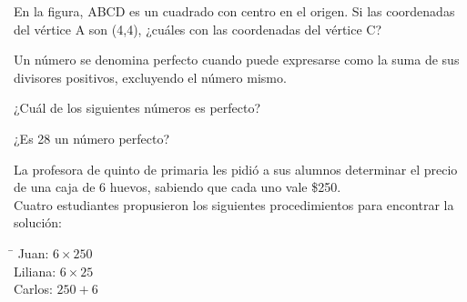 \documentclass[letterpaper,10pt]{examdesign}
\begin{document}
\begin{multiplechoice}[keycolumns=4,examcolumns=2]
\begin{question}
\begin{center}
\end{center}
\end{question}
\begin{question}
En la figura, ABCD es un cuadrado con centro en el origen. Si las coordenadas del vértice A son (4,4), ¿cuáles con las coordenadas del vértice C?
\begin{center}
\end{center}
\end{question}
\begin{block}[questions=2]
Un número se denomina perfecto cuando puede expresarse como la suma de sus divisores
positivos, excluyendo el número mismo.
\begin{question}
¿Cuál de los siguientes números es perfecto?
\end{question}
\begin{question}
¿Es 28 un número perfecto?
\end{question}
\end{block}
\begin{question}
La profesora de quinto de primaria les pidió a sus alumnos determinar el precio de una
caja de 6 huevos, sabiendo que cada uno vale \$250.\\
Cuatro estudiantes propusieron los siguientes procedimientos para encontrar la solución:
\begin{tabbing}
\hspace{1.5cm}\=\kill
Juan: \> $6\times 250$\\ 
Liliana: \> $6\times 25$ \\ 
Carlos: \> $250+6$\\ 

\end{tabbing}
\end{question}
\end{multiplechoice}
\end{document}
